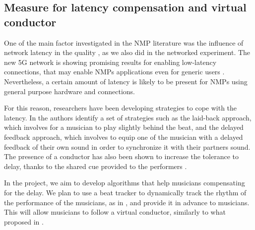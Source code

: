 \subsection{Measure for latency compensation and virtual conductor}
One of the main factor investigated in the NMP literature was the influence of network latency in the quality \cite{RottondiOverview,drioli2013networked}, as we also did in the networked experiment. The new 5G network is showing promising results for enabling low-latency connections, that may enable NMPs applications even for generic users \cite{uk5G}. Nevertheless, a certain amount of latency is likely to be present for NMPs using general purpose hardware and connections. 

For this reason, researchers have been developing strategies to cope with the latency. In \cite{Carot07networkmusic} the authors identify a set of strategies such as the laid-back approach, which involves for a musician to play slightly behind the beat, and the delayed feedback approach, which involves to equip one of the musician with a delayed feedback of their own sound in order to synchronize it with their partners sound. The presence of a conductor has also been shown to increase the tolerance to delay, thanks to the shared cue provided to the performers \cite{Olmos2009}.

In the project, we aim to develop algorithms that help musicians compensating for the delay. We plan to use a beat tracker to dynamically track the rhythm of the performance of the musicians, as in \cite{Goto2010}, and provide it in advance to musicians. This will allow musicians to follow a virtual conductor, similarly to what proposed in \cite{conductor2008}.

